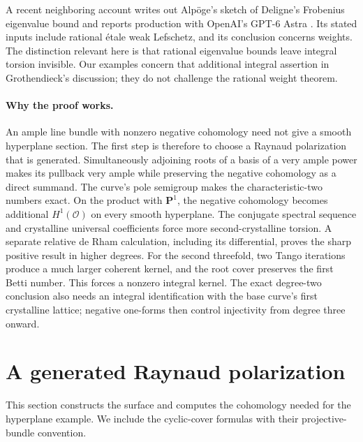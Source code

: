 \documentclass[11pt,a4paper]{article}
\newcommand{\OO}{\mathcal O}
\newcommand{\PP}{\mathbf P}
\theoremstyle{definition}\newtheorem{definition}[theorem]{Definition}
\theoremstyle{remark}\newtheorem{remark}[theorem]{Remark}
\numberwithin{equation}{section}
\begin{document}
A recent neighboring account writes out Alpöge's sketch of Deligne's Frobenius eigenvalue bound and reports production with OpenAI's GPT-6 Astra \citep{Hexagon}. Its stated inputs include rational étale weak Lefschetz, and its conclusion concerns weights. The distinction relevant here is that rational eigenvalue bounds leave integral torsion invisible. Our examples concern that additional integral assertion in Grothendieck's discussion; they do not challenge the rational weight theorem.

\paragraph{Why the proof works.}
An ample line bundle with nonzero negative cohomology need not give a smooth hyperplane section. The first step is therefore to choose a Raynaud polarization that is generated. Simultaneously adjoining roots of a basis of a very ample power makes its pullback very ample while preserving the negative cohomology as a direct summand. The curve's pole semigroup makes the characteristic-two numbers exact. On the product with $\PP^1$, the negative cohomology becomes additional $H^1(\OO)$ on every smooth hyperplane. The conjugate spectral sequence and crystalline universal coefficients force more second-crystalline torsion. A separate relative de Rham calculation, including its differential, proves the sharp positive result in higher degrees. For the second threefold, two Tango iterations produce a much larger coherent kernel, and the root cover preserves the first Betti number. This forces a nonzero integral kernel. The exact degree-two conclusion also needs an integral identification with the base curve's first crystalline lattice; negative one-forms then control injectivity from degree three onward.

\section{A generated Raynaud polarization}\label{sec:surface}

This section constructs the surface and computes the cohomology needed for the hyperplane example. We include the cyclic-cover formulas with their projective-bundle convention.
\end{document}
